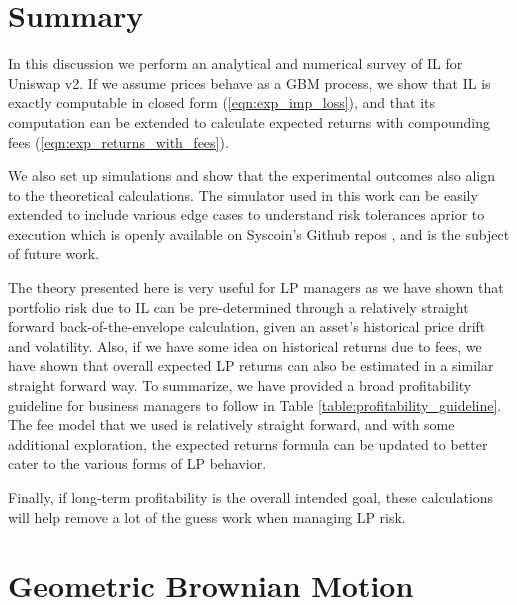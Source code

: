 \documentclass[journal,twocolumn,12pt]{ieeesyscoin}
\begin{document}
\section{Summary}
\label{section:summary}

In this discussion we perform an analytical and numerical survey of IL for Uniswap v2. If we assume prices behave as a GBM process, we show that IL is exactly computable in closed form (\ref{eqn:exp_imp_loss}), and that its computation can be extended to calculate expected returns with compounding fees (\ref{eqn:exp_returns_with_fees}). 

We also set up simulations and show that the experimental outcomes also align to the theoretical calculations. The simulator used in this work can be easily extended to include various edge cases to understand risk tolerances aprior to execution which is openly available on Syscoin's Github repos \cite{DAOSim23}, and is the subject of future work.

The theory presented here is very useful for LP managers as we have shown that portfolio risk due to IL can be pre-determined through a relatively straight forward back-of-the-envelope calculation, given an asset's historical price drift and volatility. Also, if we have some idea on historical returns due to fees, we have shown that overall expected LP returns can also be estimated in a similar straight forward way. To summarize, we have provided a broad profitability guideline for business managers to follow in Table \ref{table:profitability_guideline}. The fee model that we used is relatively straight forward, and with some additional exploration, the expected returns formula can be updated to better cater to the various forms of LP behavior. 

Finally, if long-term profitability is the overall intended goal, these calculations will help remove a lot of the guess work when managing LP risk.  

\appendices

\section{Geometric Brownian Motion}
\label{sec:gbm}
\end{document}
